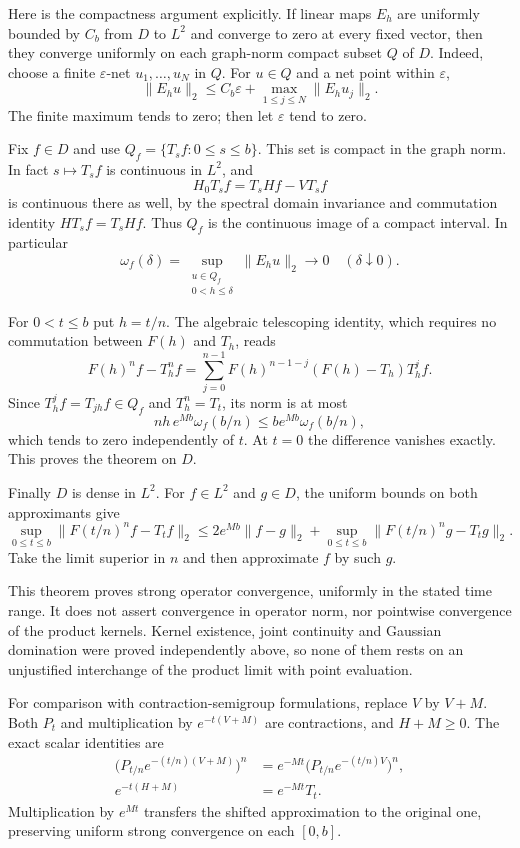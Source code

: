 Here is the compactness argument explicitly. If linear maps $E_h$
are uniformly bounded by $C_b$ from $D$ to $L^2$ and converge to
zero at every fixed vector, then they converge uniformly on each
graph-norm compact subset $Q$ of $D$. Indeed, choose a finite
$\varepsilon$-net $u_1,\ldots,u_N$ in $Q$. For $u\in Q$ and a
net point within $\varepsilon$,
\[
\|E_hu\|_2\leq C_b\varepsilon+
                     \max_{1\leq j\leq N}\|E_hu_j\|_2.
\]
The finite maximum tends to zero; then let $\varepsilon$ tend to zero.

Fix $f\in D$ and use
$Q_f=\{T_sf:0\leq s\leq b\}$. This set is compact in the graph
norm. In fact $s\mapsto T_sf$ is continuous in $L^2$, and
\[
H_0T_sf=T_sHf-VT_sf
\]
is continuous there as well, by the spectral domain invariance and
commutation identity $HT_sf=T_sHf$. Thus $Q_f$ is the continuous
image of a compact interval. In particular
\[
\omega_f(\delta)=
\sup_{\substack{u\in Q_f\\0<h\leq\delta}}\|E_hu\|_2
\longrightarrow0\quad(\delta\downarrow0).
\]

For $0<t\leq b$ put $h=t/n$. The algebraic telescoping identity,
which requires no commutation between $F(h)$ and $T_h$, reads
\[
F(h)^nf-T_h^nf
 =\sum_{j=0}^{n-1}F(h)^{n-1-j}(F(h)-T_h)T_h^jf.
\]
Since $T_h^jf=T_{jh}f\in Q_f$ and $T_h^n=T_t$, its norm is at
most
\[
nh\,e^{Mb}\omega_f(b/n)
\leq b e^{Mb}\omega_f(b/n),
\]
which tends to zero independently of $t$. At $t=0$ the difference
vanishes exactly. This proves the theorem on $D$.

Finally $D$ is dense in $L^2$. For $f\in L^2$ and $g\in D$,
the uniform bounds on both approximants give
\[
\sup_{0\leq t\leq b}\|F(t/n)^nf-T_tf\|_2
\leq2e^{Mb}\|f-g\|_2
 +\sup_{0\leq t\leq b}\|F(t/n)^ng-T_tg\|_2.
\]
Take the limit superior in $n$ and then approximate $f$ by such $g$.
\Done

This theorem proves strong operator convergence, uniformly in the
stated time range. It does not assert convergence in operator norm,
nor pointwise convergence of the product kernels. Kernel existence,
joint continuity and Gaussian domination were proved independently
above, so none of them rests on an unjustified interchange of the
product limit with point evaluation.

For comparison with contraction-semigroup formulations, replace $V$ by
$V+M$. Both $P_t$ and multiplication by $e^{-t(V+M)}$ are contractions,
and $H+M\geq0$. The exact scalar identities are
\[
\begin{aligned}
\bigl(P_{t/n}e^{-(t/n)(V+M)}\bigr)^n
 &=e^{-Mt}\bigl(P_{t/n}e^{-(t/n)V}\bigr)^n,\\
e^{-t(H+M)}&=e^{-Mt}T_t.
\end{aligned}
\]
Multiplication by $e^{Mt}$ transfers the shifted approximation to the
original one, preserving uniform strong convergence on each $[0,b]$.

